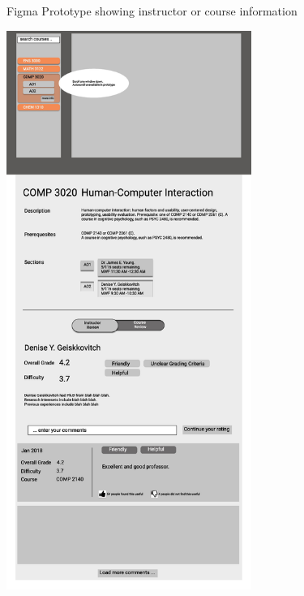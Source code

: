 \documentclass{article}
\begin{document}
\newpage
    \begin{figure}[h]
        \centering
        Figma Prototype showing instructor or course information
        
        \includegraphics[width=8cm]{ViewCourseInfo_Prototype/Course_Instructor3.jpg}
        \hspace{2mm}

\end{figure}
\end{document}
